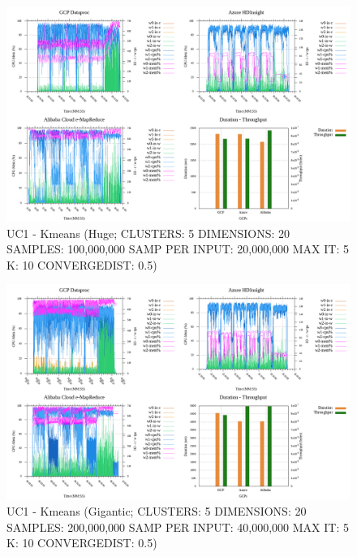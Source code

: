 \documentclass[review]{elsarticle}
\begin{document}
\begin{figure}[p]
	\caption{UC1 - Kmeans (Huge; CLUSTERS: 5 DIMENSIONS: 20 SAMPLES: 100,000,000 SAMP PER INPUT: 20,000,000 MAX IT: 5 K: 10 CONVERGEDIST: 0.5)}
	\label{fig:uc1-kmeans-h-cmidt}
	\includegraphics[width=\textwidth]{uc1-kmeans-h-cmidt}
	\centering
\end{figure}

\begin{figure}[p]
	\caption{UC1 - Kmeans (Gigantic; CLUSTERS: 5 DIMENSIONS: 20 SAMPLES: 200,000,000 SAMP PER INPUT: 40,000,000 MAX IT: 5 K: 10 CONVERGEDIST: 0.5)}
	\label{fig:uc1-kmeans-g-cmidt}
	\includegraphics[width=\textwidth]{uc1-kmeans-g-cmidt}
	\centering
\end{figure}
\end{document}
